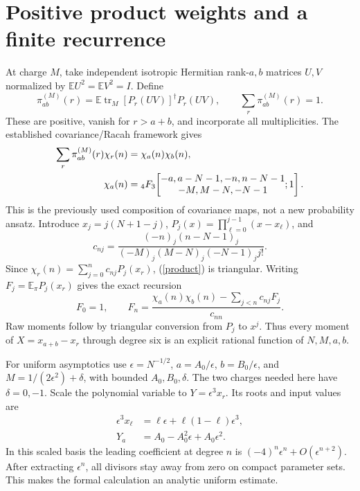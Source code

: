 \documentclass[11pt,a4paper]{article}
\newcommand{\EE}{\mathbb E}
\newcommand{\tr}{\operatorname{tr}}
\begin{document}
\section{Positive product weights and a finite recurrence}
At charge $M$, take independent isotropic Hermitian rank-$a,b$
matrices $U,V$ normalized by $\EE U^2=\EE V^2=I$. Define
\begin{equation}
 \pi^{(M)}_{ab}(r)=\EE\tr_M[P_r(UV)]^\dagger P_r(UV),\qquad
 \sum_r\pi^{(M)}_{ab}(r)=1.
\end{equation}
These are positive, vanish for $r>a+b$, and incorporate all
multiplicities. The established covariance/Racah framework
\cite{kota,ks} gives
\begin{align}
 \sum_r\pi^{(M)}_{ab}(r)\chi_r(n)&=\chi_a(n)\chi_b(n),\label{product}\\
 \chi_a(n)&={}_4F_3\!\left[\begin{matrix}-a,a-N-1,-n,n-N-1\\
                 -M,M-N,-N-1\end{matrix};1\right].\notag
\end{align}
This is the previously used composition of covariance maps, not a
new probability ansatz. Introduce $x_j=j(N+1-j)$,
$P_j(x)=\prod_{\ell=0}^{j-1}(x-x_\ell)$, and
\begin{equation}
 c_{nj}=\frac{(-n)_j(n-N-1)_j}
 {(-M)_j(M-N)_j(-N-1)_j j!}.
\end{equation}
Since $\chi_r(n)=\sum_{j=0}^n c_{nj}P_j(x_r)$, (\ref{product})
is triangular. Writing $F_j=\EE_\pi P_j(x_r)$ gives the exact recursion
\begin{equation}
 F_0=1,\qquad
 F_n=\frac{\chi_a(n)\chi_b(n)-\sum_{j<n}c_{nj}F_j}{c_{nn}}.
 \label{recursion}
\end{equation}
Raw moments follow by triangular conversion from $P_j$ to $x^j$.
Thus every moment of $X=x_{a+b}-x_r$ through degree six is an
explicit rational function of $N,M,a,b$.

For uniform asymptotics use $\epsilon=N^{-1/2}$,
$a=A_0/\epsilon$, $b=B_0/\epsilon$, and
$M=1/(2\epsilon^2)+\delta$, with bounded $A_0,B_0,\delta$.
The two charges needed here have $\delta=0,-1$. Scale the polynomial
variable to $Y=\epsilon^3x_r$. Its roots and input values are
\begin{align}
 \epsilon^3x_\ell&=\ell\epsilon+\ell(1-\ell)\epsilon^3,\\
 Y_a&=A_0-A_0^2\epsilon+A_0\epsilon^2.
\end{align}
In this scaled basis the leading coefficient at degree $n$ is
$(-4)^n\epsilon^n+O(\epsilon^{n+2})$. After extracting
$\epsilon^n$, all divisors stay away from zero on compact parameter
sets. This makes the formal calculation an analytic uniform estimate.
\end{document}
